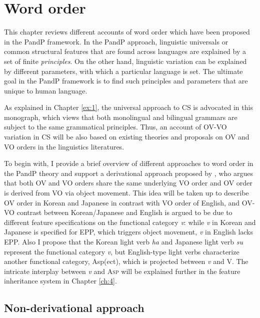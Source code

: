 \chapter{Word order}\label{ch:3}

This chapter reviews different accounts of word order which have been proposed in the \ac{PandP} framework. In the \ac{PandP} approach, linguistic universals or common structural features that are found across languages are explained by a set of finite \textit{principles}. On the other hand, linguistic variation can be explained by different parameters, with which a particular language is set. The ultimate goal in the \ac{PandP} framework is to find such principles and parameters that are unique to human language.

As explained in Chapter \ref{ex:1}, the universal approach to \ac{CS} is advocated in this monograph, which views that both monolingual and bilingual grammars are subject to the same grammatical principles. Thus, an account of \ac{OV}-\ac{VO} variation in \ac{CS} will be also based on existing theories and proposals on \ac{OV} and \ac{VO} orders in the linguistics literatures. 

To begin with, I provide a brief overview of different approaches to word order in the \ac{PandP} theory and support a derivational approach proposed by \citet{Kayne1994}, who argues that both \ac{OV} and \ac{VO} orders share the same underlying \ac{VO} order and \ac{OV} order is derived from \ac{VO} via object movement. This idea will be taken up to describe \ac{OV} order in Korean and Japanese in contrast with \ac{VO} order of English, and \ac{OV}-\ac{VO} contrast between Korean/Japanese and English is argued to be due to different feature specifications on the functional category \textit{v}: while \textit{v} in Korean and Japanese is specified for \ac{EPP}, which triggers object movement, \textit{v} in English lacks \ac{EPP}. Also I propose that the Korean light verb \textit{ha} and Japanese light verb \textit{su} represent the functional category \textit{v}, but English-type light verbs characterize another functional category, Asp(ect), which is projected between \textit{v} and V. The intricate interplay between \textit{v} and A\textsc{sp} will be explained further in the feature inheritance system in Chapter \ref{ch:4}.

\section{Non-derivational approach}\label{ch3:sect:3.1}

